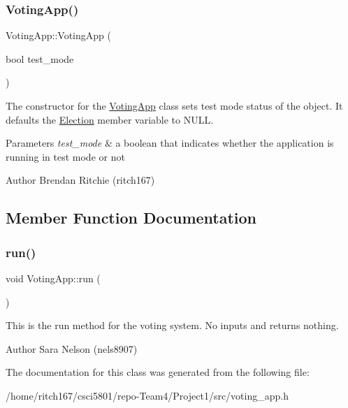 \subsubsection{\texorpdfstring{Voting\+App()}{VotingApp()}}
{\footnotesize\ttfamily Voting\+App\+::\+Voting\+App (\begin{DoxyParamCaption}\item[{bool}]{test\+\_\+mode }\end{DoxyParamCaption})}

The constructor for the \hyperlink{classVotingApp}{Voting\+App} class sets test mode status of the object. It defaults the \hyperlink{classElection}{Election} member variable to N\+U\+LL. 
\begin{DoxyParams}{Parameters}
{\em test\+\_\+mode} & a boolean that indicates whether the application is running in test mode or not \\
\hline
\end{DoxyParams}
\begin{DoxyAuthor}{Author}
Brendan Ritchie (ritch167) 
\end{DoxyAuthor}


\subsection{Member Function Documentation}
\mbox{\label{classVotingApp_a9d62b11e6082588a0b01752f838e0611}} 
\subsubsection{\texorpdfstring{run()}{run()}}
{\footnotesize\ttfamily void Voting\+App\+::run (\begin{DoxyParamCaption}{ }\end{DoxyParamCaption})}

This is the run method for the voting system. No inputs and returns nothing. \begin{DoxyAuthor}{Author}
Sara Nelson (nels8907) 
\end{DoxyAuthor}


The documentation for this class was generated from the following file\+:\begin{DoxyCompactItemize}
\item 
/home/ritch167/csci5801/repo-\/\+Team4/\+Project1/src/voting\+\_\+app.\+h\end{DoxyCompactItemize}
